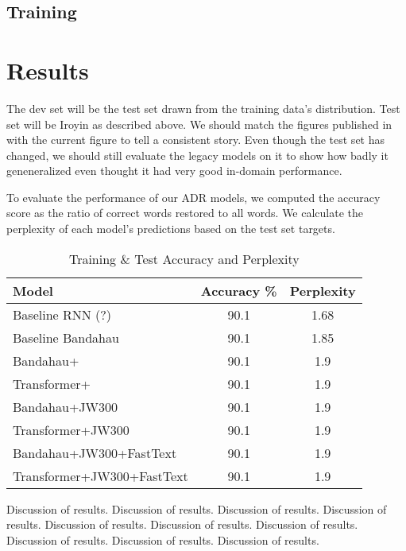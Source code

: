 \documentclass{article} %
\begin{document}
\subsection{Training}\label{sec:training}

\section{Results}\label{sec:results}

The dev set will be the test set drawn from the training data's distribution. Test set will be Iroyin as described above. We should match the figures published in \citep{orife2018adr} with the current figure to tell a consistent story. Even though the test set has changed, we should still evaluate the legacy models on it to show how badly it geneneralized even thought it had very good in-domain performance.

To evaluate the performance of our ADR models, we computed the accuracy score as the ratio of correct words restored to all words. We calculate the perplexity of each model's predictions based on the test set targets.
 \begin{table}[h]
  \caption{Training \& Test Accuracy and Perplexity}
  \label{tab:results}
  \centering
  \begin{tabular}{lcc}
    \toprule
    \textbf{Model} & \textbf{Accuracy \%} &\textbf{Perplexity} \\
    \midrule
    Baseline RNN (?) & 90.1 & 1.68 \\
    Baseline Bandahau & 90.1 & 1.85 \\
    \midrule
	Bandahau+ & 90.1 & 1.9 \\ 
	Transformer+ & 90.1 & 1.9 \\ 
    \midrule
	Bandahau+JW300 & 90.1 & 1.9 \\ 
	Transformer+JW300 & 90.1 & 1.9 \\ 
	\midrule
	Bandahau+JW300+FastText & 90.1 & 1.9 \\ 
	Transformer+JW300+FastText & 90.1 & 1.9 \\ 
    \bottomrule
  \end{tabular}
\end{table}
Discussion of results. Discussion of results. Discussion of results. Discussion of results. Discussion of results. Discussion of results. Discussion of results. Discussion of results. Discussion of results. Discussion of results. 
\end{document}
